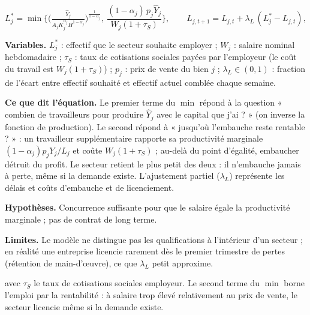 \documentclass[11pt,a4paper]{article}
\newcommand{\variables}{\par\noindent\textbf{Variables.} }
\newcommand{\sens}{\par\noindent\textbf{Ce que dit l'équation.} }
\newcommand{\hyp}{\par\noindent\textbf{Hypothèses.} }
\newcommand{\limites}{\par\noindent\textbf{Limites.} }
\begin{document}
\begin{equation}
L^\ast_j = \min\!\Big\{\Big(\tfrac{\hat Y_j}{A_j K_j^{\alpha_j} H^{1-\alpha_j}}\Big)^{\frac{1}{1-\alpha_j}},\ 
\frac{(1-\alpha_j)\,p_j \hat Y_j}{W_j (1+\tau_{S})}\Big\}, \qquad
L_{j,t+1} = L_{j,t} + \lambda_L\,(L^\ast_j - L_{j,t}),
\label{eq:labour}
\end{equation}
\begin{lecture}
\variables $L^\ast_j$ : effectif que le secteur souhaite employer ; $W_j$ : salaire nominal hebdomadaire ; $\tau_S$ : taux de cotisations sociales payées par l'employeur (le coût du travail est $W_j(1+\tau_S)$) ; $p_j$ : prix de vente du bien $j$ ; $\lambda_L\in(0,1)$ : fraction de l'écart entre effectif souhaité et effectif actuel comblée chaque semaine.
\sens Le premier terme du $\min$ répond à la question « combien de travailleurs pour produire $\hat Y_j$ avec le capital que j'ai ? » (on inverse la fonction de production). Le second répond à « jusqu'où l'embauche reste rentable ? » : un travailleur supplémentaire rapporte sa productivité marginale $(1-\alpha_j)p_jY_j/L_j$ et coûte $W_j(1+\tau_S)$ ; au-delà du point d'égalité, embaucher détruit du profit. Le secteur retient le plus petit des deux : il n'embauche jamais à perte, même si la demande existe. L'ajustement partiel ($\lambda_L$) représente les délais et coûts d'embauche et de licenciement.
\hyp Concurrence suffisante pour que le salaire égale la productivité marginale ; pas de contrat de long terme.
\limites Le modèle ne distingue pas les qualifications à l'intérieur d'un secteur ; en réalité une entreprise licencie rarement dès le premier trimestre de pertes (rétention de main-d'œuvre), ce que $\lambda_L$ petit approxime.
\end{lecture}
avec $\tau_S$ le taux de cotisations sociales employeur. Le second terme du $\min$ borne l'emploi par la rentabilité : à salaire trop élevé relativement au prix de vente, le secteur licencie même si la demande existe.
\end{document}
